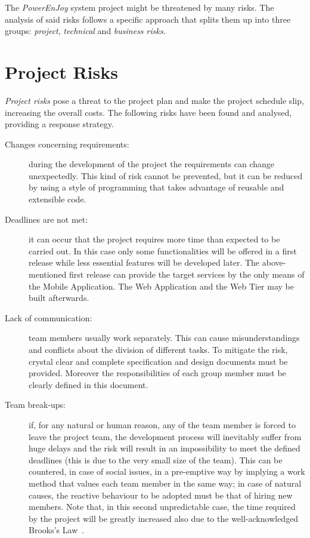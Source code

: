 
The \emph{PowerEnJoy} system project might be threatened by many risks. The analysis of said risks follows a specific approach that splits them up into three groups: \textit{project}, \textit{technical} and \textit{business risks}.

\section{Project Risks}
\textit{Project risks} pose a threat to the project plan and make the project schedule slip, increasing the overall costs.
The following risks have been found and analysed, providing a response strategy. 
\begin{description}
\item[Changes concerning requirements:] during the development of the project the requirements can change unexpectedly. This kind of risk cannot be prevented, but it can be reduced by using a style of programming that takes advantage of reusable and extensible code.
\item[Deadlines are not met:] it can occur that the project requires more time than expected to be carried out. In this case only some functionalities will be offered in a first release while less essential features will be developed later. The above-mentioned first release can provide the target services by the only means of the Mobile Application. The Web Application and the Web Tier may be built afterwards.
\item[Lack of communication:] team members usually work separately. This can cause misunderstandings and conflicts about the division of different tasks. To mitigate the risk, crystal clear and complete specification and design documents must be provided. Moreover the responsibilities of each group member must be clearly defined in this document.
\item[Team break-ups:] if, for any natural or human reason, any of the team member is forced to leave the project team, the development process will inevitably suffer from huge delays and the risk will result in an impossibility to meet the defined deadlines (this is due to the very small size of the team). This can be countered, in case of social issues, in a pre-emptive way by implying a work method that values each team member in the same way; in case of natural causes, the reactive behaviour to be adopted must be that of hiring new members. Note that, in this second unpredictable case, the time required by the project will be greatly increased also due to the well-acknowledged Brooks's Law~\cite{mythical-man-month}.
\end{description}

